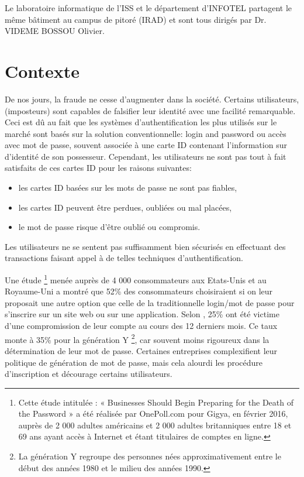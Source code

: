 Le laboratoire informatique de l'ISS et le département d'INFOTEL partagent le même bâtiment au campus de pitoré (IRAD) et sont tous dirigés par Dr. VIDEME BOSSOU Olivier. 

\section{Contexte}

De nos jours, la fraude ne cesse d'augmenter dans la société. Certains
utilisateurs, (imposteurs) sont capables de falsifier leur identité avec une
facilité remarquable. Ceci est dû au fait que les systèmes d'authentification les
plus utilisés sur le marché sont basés sur la solution conventionnelle: \og login and
password\fg{} ou accès avec mot de passe, souvent associée à une carte ID
contenant l'information sur d'identité de son possesseur. Cependant, les
utilisateurs ne sont pas tout à fait satisfaits de ces cartes ID pour les raisons
suivantes:
\begin{itemize}
	\item les cartes ID basées sur les mots de passe ne sont pas fiables,
	\item les cartes ID peuvent être perdues, oubliées ou mal placées,
	\item le mot de passe risque d'être oublié ou compromis.
\end{itemize}
Les utilisateurs ne se sentent pas suffisamment bien sécurisés en effectuant des transactions faisant appel à de telles techniques d'authentification.  

Une étude \footnote{Cette étude intitulée : « Businesses Should Begin Preparing for the Death of the Password » a été réalisée par OnePoll.com pour Gigya, en février 2016, auprès de 2 000 adultes américains et 2 000 adultes britanniques entre 18 et 69 ans ayant accès à Internet et étant titulaires de comptes en ligne.} menée auprès de 4 000 consommateurs aux Etats-Unis et au Royaume-Uni \cite{BIOM}a montré que 52\% des consommateurs  choisiraient si on leur proposait  une autre option que celle de la traditionnelle \og login/mot de passe\fg{} pour s'inscrire sur un site web ou sur une application. Selon \cite{BIOM}, 25\% ont été victime d'une compromission de leur compte au cours des 12 derniers mois. Ce taux monte à 35\% pour la génération Y \footnote{La génération Y regroupe des personnes nées approximativement entre le début des années 1980 et le milieu des années 1990.}, car souvent moins rigoureux dans la détermination de leur mot de passe. Certaines entreprises complexifient leur politique de génération de mot de passe, mais cela alourdi les procédure d'inscription et décourage certains utilisateurs.

